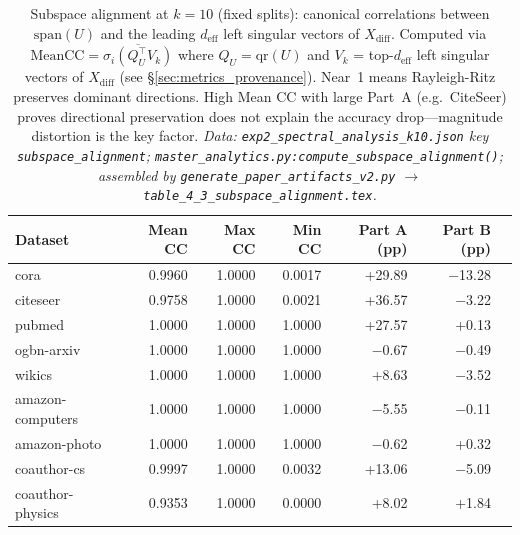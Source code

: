 \documentclass[11pt]{article}
\begin{document}
\begin{table}[H]
\centering\small\setlength{\tabcolsep}{5pt}
\caption{Subspace alignment at $k{=}10$ (fixed splits): canonical correlations between
$\mathrm{span}(U)$ and the leading $d_{\mathrm{eff}}$ left singular vectors of $X_{\mathrm{diff}}$.
Computed via $\mathrm{MeanCC} = \overline{\sigma_i(Q_U^\top V_k)}$ where $Q_U=\mathrm{qr}(U)$
and $V_k$ = top-$d_{\mathrm{eff}}$ left singular vectors of $X_{\mathrm{diff}}$ (see
\S\ref{sec:metrics_provenance}).  Near~1 means Rayleigh-Ritz preserves dominant directions.
High Mean CC with large Part~A (e.g.\ CiteSeer) proves directional preservation does not
explain the accuracy drop---magnitude distortion is the key factor.
\textit{\scriptsize Data: \texttt{exp2\_spectral\_analysis\_k10.json} key \texttt{subspace\_alignment};
\texttt{master\_analytics.py:compute\_subspace\_alignment()};
assembled by \texttt{generate\_paper\_artifacts\_v2.py} $\to$ \texttt{table\_4\_3\_subspace\_alignment.tex}.}}
\label{tab:subspace_alignment}
\begin{tabular}{lrrrrrr}
\toprule
Dataset & Mean CC & Max CC & Min CC & Part A (pp) & Part B (pp) \\
\midrule
cora             & 0.9960 & 1.0000 & 0.0017 & +29.89 & $-$13.28 \\
citeseer         & 0.9758 & 1.0000 & 0.0021 & +36.57 & $-$3.22 \\
pubmed           & 1.0000 & 1.0000 & 1.0000 & +27.57 & +0.13 \\
ogbn-arxiv       & 1.0000 & 1.0000 & 1.0000 & $-$0.67 & $-$0.49 \\
wikics           & 1.0000 & 1.0000 & 1.0000 & +8.63 & $-$3.52 \\
amazon-computers & 1.0000 & 1.0000 & 1.0000 & $-$5.55 & $-$0.11 \\
amazon-photo     & 1.0000 & 1.0000 & 1.0000 & $-$0.62 & +0.32 \\
coauthor-cs      & 0.9997 & 1.0000 & 0.0032 & +13.06 & $-$5.09 \\
coauthor-physics & 0.9353 & 1.0000 & 0.0000 & +8.02 & +1.84 \\
\bottomrule
\end{tabular}
\end{table}
\end{document}
